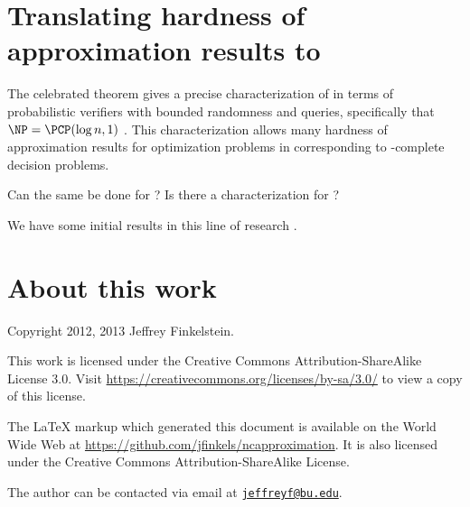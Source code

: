 \documentclass[]{article}
\newcommand{\email}[1]{\href{mailto:#1}{\nolinkurl{#1}}}
\begin{document}
\section{Translating hardness of approximation results to \texorpdfstring{\NC}{NC}}

The celebrated \PCP{} theorem gives a precise characterization of \NP{} in terms of probabilistic verifiers with bounded randomness and queries, specifically that $\NP = \PCP(\log n, 1)$ \cite{pcp}.
This characterization allows many hardness of approximation results for optimization problems in \NPO{} corresponding to \NP-complete decision problems.

\begin{todo}
  Can the same be done for \NNC?
  Is there a \PCP{} characterization for \NNC?
\end{todo}

We have some initial results in this line of research \cite{finkelstein13}.

\section{About this work}

Copyright 2012, 2013 Jef{}frey Finkelstein.

This work is licensed under the Creative Commons Attribution-ShareAlike License 3.0.
Visit \mbox{\url{https://creativecommons.org/licenses/by-sa/3.0/}} to view a copy of this license.

The \LaTeX{} markup which generated this document is available on the World Wide Web at \mbox{\url{https://github.com/jfinkels/ncapproximation}}.
It is also licensed under the Creative Commons Attribution-ShareAlike License.

The author can be contacted via email at \email{jeffreyf@bu.edu}.



\end{document}
